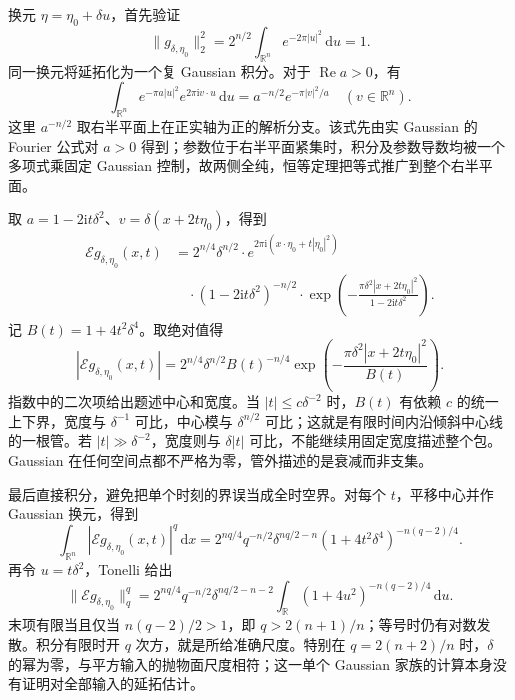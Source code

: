 \begin{solution}
换元 \(\eta=\eta_0+\delta u\)，首先验证
\[
 \|g_{\delta,\eta_0}\|_2^2
 =2^{n/2}\int_{\mathbb R^n}e^{-2\pi|u|^2}\,\mathrm du=1.
\]
同一换元将延拓化为一个复 Gaussian 积分。对于 \(\operatorname{Re}a>0\)，有
\[
 \int_{\mathbb R^n}e^{-\pi a|u|^2}e^{2\pi\mathrm i v\cdot u}\,\mathrm du
 =a^{-n/2}e^{-\pi|v|^2/a}\quad(v\in\mathbb R^n).
\]
这里 \(a^{-n/2}\) 取右半平面上在正实轴为正的解析分支。该式先由实 Gaussian 的 Fourier 公式对 \(a>0\) 得到；参数位于右半平面紧集时，积分及参数导数均被一个多项式乘固定 Gaussian 控制，故两侧全纯，恒等定理把等式推广到整个右半平面。

取 \(a=1-2\mathrm i t\delta^2\)、\(v=\delta(x+2t\eta_0)\)，得到
\[
 \begin{aligned}
 \mathcal Eg_{\delta,\eta_0}(x,t)
 &=2^{n/4}\delta^{n/2}
   \cdot e^{2\pi\mathrm i(x\cdot\eta_0+t|\eta_0|^2)}\\
 &\quad\cdot(1-2\mathrm i t\delta^2)^{-n/2}
   \cdot\exp\left(-\frac{\pi\delta^2|x+2t\eta_0|^2}
                       {1-2\mathrm i t\delta^2}\right).
 \end{aligned}
\]
记 \(B(t)=1+4t^2\delta^4\)。取绝对值得
\[
 |\mathcal Eg_{\delta,\eta_0}(x,t)|
 =2^{n/4}\delta^{n/2}B(t)^{-n/4}
       \exp\left(-\frac{\pi\delta^2|x+2t\eta_0|^2}{B(t)}\right).
\]
指数中的二次项给出题述中心和宽度。当 \(|t|\leq c\delta^{-2}\) 时，\(B(t)\) 有依赖 \(c\) 的统一上下界，宽度与 \(\delta^{-1}\) 可比，中心模与 \(\delta^{n/2}\) 可比；这就是有限时间内沿倾斜中心线的一根管。若 \(|t|\gg\delta^{-2}\)，宽度则与 \(\delta|t|\) 可比，不能继续用固定宽度描述整个包。Gaussian 在任何空间点都不严格为零，管外描述的是衰减而非支集。

最后直接积分，避免把单个时刻的界误当成全时空界。对每个 \(t\)，平移中心并作 Gaussian 换元，得到
\[
 \int_{\mathbb R^n}|\mathcal Eg_{\delta,\eta_0}(x,t)|^q\,\mathrm dx
 =2^{nq/4}q^{-n/2}\delta^{nq/2-n}
       (1+4t^2\delta^4)^{-n(q-2)/4}.
\]
再令 \(u=t\delta^2\)，Tonelli 给出
\[
 \|\mathcal Eg_{\delta,\eta_0}\|_q^q
 =2^{nq/4}q^{-n/2}\delta^{nq/2-n-2}
       \int_{\mathbb R}(1+4u^2)^{-n(q-2)/4}\,\mathrm du.
\]
末项有限当且仅当 \(n(q-2)/2>1\)，即 \(q>2(n+1)/n\)；等号时仍有对数发散。积分有限时开 \(q\) 次方，就是所给准确尺度。特别在 \(q=2(n+2)/n\) 时，\(\delta\) 的幂为零，与平方输入的抛物面尺度相符；这一单个 Gaussian 家族的计算本身没有证明对全部输入的延拓估计。
\end{solution}
